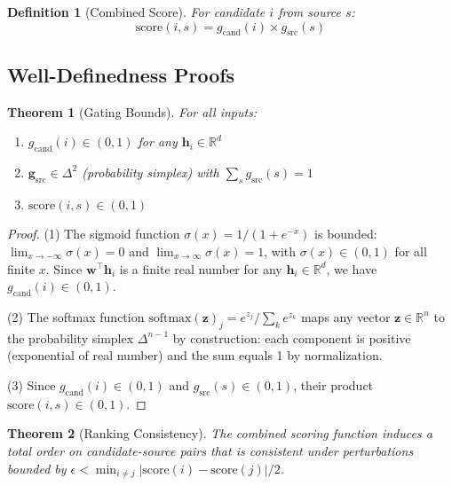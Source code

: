 \documentclass[10pt,twocolumn]{article}
\newtheorem{theorem}{Theorem}
\newtheorem{definition}{Definition}
\begin{document}
\begin{definition}[Combined Score]
For candidate $i$ from source $s$:
\begin{equation}
\text{score}(i, s) = g_{\text{cand}}(i) \times g_{\text{src}}(s)
\label{eq:combined}
\end{equation}
\end{definition}

\subsection{Well-Definedness Proofs}

\begin{theorem}[Gating Bounds]
\label{thm:bounds}
For all inputs:
\begin{enumerate}
    \item $g_{\text{cand}}(i) \in (0, 1)$ for any $\mathbf{h}_i \in \mathbb{R}^d$
    \item $\mathbf{g}_{\text{src}} \in \Delta^2$ (probability simplex) with $\sum_s g_{\text{src}}(s) = 1$
    \item $\text{score}(i, s) \in (0, 1)$
\end{enumerate}
\end{theorem}

\begin{proof}
(1) The sigmoid function $\sigma(x) = 1/(1 + e^{-x})$ is bounded: $\lim_{x \to -\infty} \sigma(x) = 0$ and $\lim_{x \to \infty} \sigma(x) = 1$, with $\sigma(x) \in (0, 1)$ for all finite $x$. Since $\mathbf{w}^\top \mathbf{h}_i$ is a finite real number for any $\mathbf{h}_i \in \mathbb{R}^d$, we have $g_{\text{cand}}(i) \in (0, 1)$.

(2) The softmax function $\text{softmax}(\mathbf{z})_j = e^{z_j} / \sum_k e^{z_k}$ maps any vector $\mathbf{z} \in \mathbb{R}^n$ to the probability simplex $\Delta^{n-1}$ by construction: each component is positive (exponential of real number) and the sum equals 1 by normalization.

(3) Since $g_{\text{cand}}(i) \in (0, 1)$ and $g_{\text{src}}(s) \in (0, 1)$, their product $\text{score}(i, s) \in (0, 1)$.
\end{proof}

\begin{theorem}[Ranking Consistency]
\label{thm:ranking}
The combined scoring function induces a total order on candidate-source pairs that is consistent under perturbations bounded by $\epsilon < \min_{i \neq j} |\text{score}(i) - \text{score}(j)|/2$.
\end{theorem}
\end{document}
